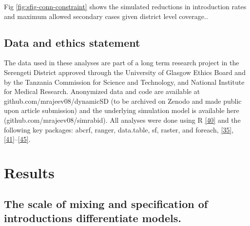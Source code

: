 \documentclass[
  oneside]{book}
\begin{document}
Fig \ref{fig:sfig-conn-constraint} shows the simulated reductions in introduction rates and maximum allowed secondary cases given district level coverage..

\hypertarget{data-and-ethics-statement}{%
\subsection{Data and ethics statement}\label{data-and-ethics-statement}}

The data used in these analyses are part of a long term research project in the Serengeti District approved through the University of Glasgow Ethics Board and by the Tanzania Commission for Science and Technology, and National Institute for Medical Research. Anonymized data and code are available at github.com/mrajeev08/dynamicSD (to be archived on Zenodo and made public upon article submission) and the underlying simulation model is available here (github.com/mrajeev08/simrabid). All analyses were done using R \protect\hyperlink{ref-R-program}{{[}40{]}} and the following key packages: abcrf, ranger, data.table, sf, raster, and foreach, \protect\hyperlink{ref-pudlo2015}{{[}35{]}}, \protect\hyperlink{ref-R-sf}{{[}41{]}}--\protect\hyperlink{ref-R-foreach}{{[}45{]}}.

\hypertarget{results-2}{%
\section{Results}\label{results-2}}

\hypertarget{the-scale-of-mixing-and-specification-of-introductions-differentiate-models.}{%
\subsection{The scale of mixing and specification of introductions differentiate models.}\label{the-scale-of-mixing-and-specification-of-introductions-differentiate-models.}}
\end{document}
